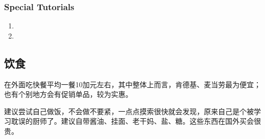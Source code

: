 \subsubsection{Special Tutorials}
\begin{enumerate}
    \item {}
    \item \Emph{\LaTeX}
\end{enumerate}


\subsection{饮食}
在外面吃快餐平均一餐10加元左右，其中整体上而言，肯德基、麦当劳最为便宜；也有个别地方会有促销单品，较为实惠。\par

建议尝试自己做饭，不会做不要紧，一点点摸索很快就会发现，原来自己是个被学习耽误的厨师了。建议自带酱油、挂面、老干妈、盐、糖。这些东西在国外买会很贵。


